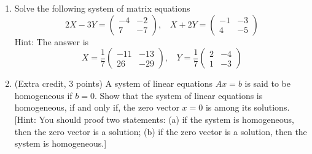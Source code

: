 \documentclass[fleqn]{article}
\begin{document}
\begin{enumerate}
    \item Solve the following system of matrix equations
      $$
        2X-3Y=\begin{pmatrix}
          -4 & -2 \\
          7 & -7
        \end{pmatrix}, ~~~~ X+2Y=\begin{pmatrix}
          -1 & -3 \\
          4 & -5
        \end{pmatrix}
      $$
      Hint: The answer is 
      $$
        X=\dfrac{1}{7}\begin{pmatrix}
          -11 & -13 \\
          26 & -29
        \end{pmatrix}, ~~~~ Y=\dfrac{1}{7}\begin{pmatrix}
          2 & -4 \\
          1 & -3
        \end{pmatrix}
      $$


    \item (Extra credit, 3 points) A system of linear equations $Ax=b$ is said to be homogeneous if
    $b=0$. Show that the system of linear equations is homogeneous, if and only if, the zero
    vector $x=0$ is among its solutions.
    [Hint: You should proof two statements: (a) if the system is homogeneous, 
    then the zero vector is a solution; (b) if the zero vector is a solution,
    then the system is homogeneous.]
  
  \end{enumerate}
\end{document}
